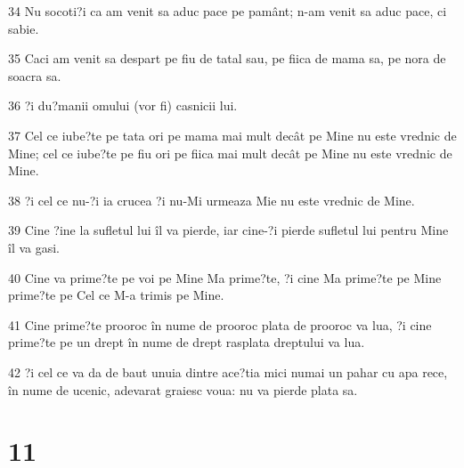\par 34 Nu socoti?i ca am venit sa aduc pace pe pamânt; n-am venit sa aduc pace, ci sabie.
\par 35 Caci am venit sa despart pe fiu de tatal sau, pe fiica de mama sa, pe nora de soacra sa.
\par 36 ?i du?manii omului (vor fi) casnicii lui.
\par 37 Cel ce iube?te pe tata ori pe mama mai mult decât pe Mine nu este vrednic de Mine; cel ce iube?te pe fiu ori pe fiica mai mult decât pe Mine nu este vrednic de Mine.
\par 38 ?i cel ce nu-?i ia crucea ?i nu-Mi urmeaza Mie nu este vrednic de Mine.
\par 39 Cine ?ine la sufletul lui îl va pierde, iar cine-?i pierde sufletul lui pentru Mine îl va gasi.
\par 40 Cine va prime?te pe voi pe Mine Ma prime?te, ?i cine Ma prime?te pe Mine prime?te pe Cel ce M-a trimis pe Mine.
\par 41 Cine prime?te prooroc în nume de prooroc plata de prooroc va lua, ?i cine prime?te pe un drept în nume de drept rasplata dreptului va lua.
\par 42 ?i cel ce va da de baut unuia dintre ace?tia mici numai un pahar cu apa rece, în nume de ucenic, adevarat graiesc voua: nu va pierde plata sa.

\chapter{11}

